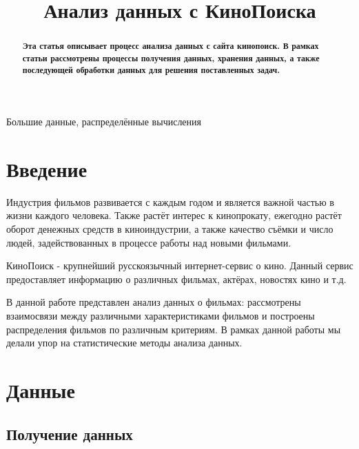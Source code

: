 \documentclass[9pt,conference]{IEEEtran}
\begin{document}
\title{Анализ данных с КиноПоиска}

\author{
}

\maketitle
\begin{abstract}
\textbf{Эта статья описывает процесс анализа данных с сайта кинопоиск. В рамках статьи рассмотрены процессы получения данных, хранения данных, а также последующей обработки данных для решения поставленных задач.}
\end{abstract}

\begin{IEEEkeywords}
Большие данные, распределённые вычисления
\end{IEEEkeywords}

\section{Введение}

Индустрия фильмов развивается с каждым годом и является важной частью в жизни каждого человека. Также растёт интерес к кинопрокату, ежегодно растёт оборот денежных средств в киноиндустрии, а также качество съёмки и число людей, задействованных в процессе работы над новыми фильмами.

КиноПоиск - крупнейший русскоязычный интернет-сервис о кино. Данный сервис предоставляет информацию о различных фильмах, актёрах, новостях кино и т.д.

В данной работе представлен анализ данных о фильмах: рассмотрены взаимосвязи между 
различными характеристиками фильмов и построены распределения фильмов по различным критериям. В рамках данной работы мы делали упор на статистические методы анализа данных.

\section{Данные}

\subsection{Получение данных}
\end{document}
